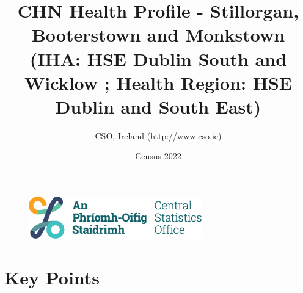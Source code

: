 \documentclass{article}
\title{CHN Health Profile - Stillorgan, Booterstown and Monkstown (IHA: HSE Dublin South and Wicklow ;  Health Region: HSE Dublin and South East) }
\date{Census 2022}
\author{CSO, Ireland  (\url{http://www.cso.ie)}}
\begin{document}


\begin{figure}
	\centering
\includegraphics[width =75mm]{../figures/CSO_Logo.png}
\end{figure}

				 
		   
						  
														  
																																													
												 
			 
\maketitle
					
													   
				 
						 
																																																																											   
				 
				  
  \pagebreak
    	    \tableofcontents

\pagebreak


\section{Key Points}
\end{document}
